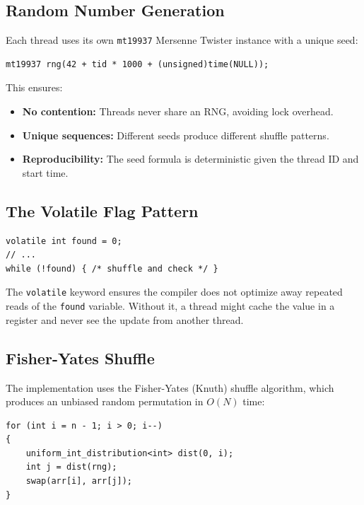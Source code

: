 \documentclass[11pt]{article}
\begin{document}
\subsection{Random Number Generation}

Each thread uses its own \texttt{mt19937} Mersenne Twister instance with a unique seed:
\begin{codebox}
\begin{lstlisting}
mt19937 rng(42 + tid * 1000 + (unsigned)time(NULL));
\end{lstlisting}
\end{codebox}

This ensures:
\begin{itemize}
    \item \textbf{No contention:} Threads never share an RNG, avoiding lock overhead.
    \item \textbf{Unique sequences:} Different seeds produce different shuffle patterns.
    \item \textbf{Reproducibility:} The seed formula is deterministic given the thread ID and start time.
\end{itemize}

\subsection{The Volatile Flag Pattern}

\begin{codebox}
\begin{lstlisting}
volatile int found = 0;
// ...
while (!found) { /* shuffle and check */ }
\end{lstlisting}
\end{codebox}

The \texttt{volatile} keyword ensures the compiler does not optimize away repeated reads of the \texttt{found} variable. Without it, a thread might cache the value in a register and never see the update from another thread.

\subsection{Fisher-Yates Shuffle}

The implementation uses the Fisher-Yates (Knuth) shuffle algorithm, which produces an unbiased random permutation in $O(N)$ time:
\begin{codebox}
\begin{lstlisting}
for (int i = n - 1; i > 0; i--)
{
    uniform_int_distribution<int> dist(0, i);
    int j = dist(rng);
    swap(arr[i], arr[j]);
}
\end{lstlisting}
\end{codebox}
\end{document}
